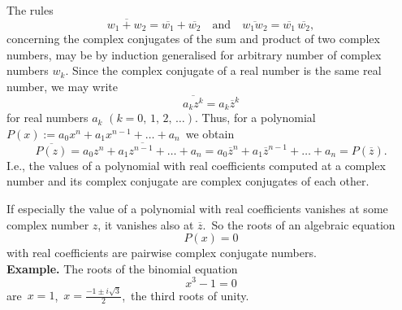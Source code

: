 \documentclass[12pt]{article}
\theoremstyle{definition}
\begin{document}
The rules
$$\overline{w_1+w_2} = \overline{w_1}+\overline{w_2} \quad\mbox{and}\quad \overline{w_1w_2} = \overline{w_1}\,\overline{w_2},$$
concerning the complex conjugates of the sum and product of two complex numbers, may be by induction generalised for arbitrary number of complex numbers $w_k$.  Since the complex conjugate of a real number is the same real number, we may write
$$\overline{a_kz^k} = a_k\overline{z}^k$$
for real numbers $a_k\,\, (k = 0,\,1,\,2,\,\ldots)$.  Thus, for a polynomial \,$P(x) := a_0x^n+a_1x^{n-1}+\ldots+a_n$\, we obtain
$$\overline{P(z)} = \overline{a_0z^n+a_1z^{n-1}+\ldots+a_n} = 
{a_0\overline{z}^n+a_1\overline{z}^{n-1}+\ldots+a_n} = P(\overline{z}).$$
I.e., the values of a polynomial with real coefficients computed at a complex number and its complex conjugate are 
complex conjugates of each other.

If especially the value of a polynomial with real coefficients vanishes at some complex number $z$, it vanishes also at $\overline{z}$.\, So the roots of an algebraic equation
$$P(x) = 0$$
with real coefficients are pairwise complex conjugate numbers.\\

\textbf{Example.}  The roots of the binomial equation
$$x^3\!-\!1 = 0$$
are\, $x = 1$,\, $x = \frac{-1\pm{i}\sqrt{3}}{2}$,\, the third roots of unity.
\end{document}
